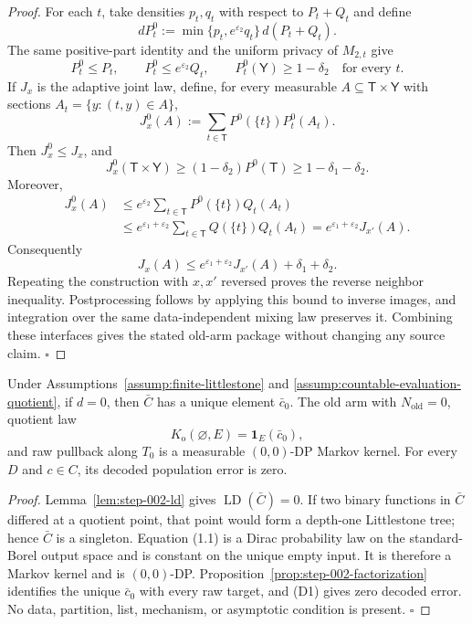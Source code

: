 \begin{proof}
For each \(t\), take densities \(p_t,q_t\) with respect to
\(P_t+Q_t\) and define
\[
 dP_t^0:=\min\{p_t,e^{\varepsilon_2}q_t\}\,d(P_t+Q_t).
\]
The same positive-part identity and the uniform privacy of \(M_{2,t}\)
give
\[
 P_t^0\le P_t,\qquad P_t^0\le e^{\varepsilon_2}Q_t,\qquad
 P_t^0(\mathsf Y)\ge1-\delta_2
 \quad\text{for every }t.
\]
If \(J_x\) is the adaptive joint law, define, for every measurable
\(A\subseteq\mathsf T\times\mathsf Y\) with sections
\(A_t=\{y:(t,y)\in A\}\),
\[
 J_x^0(A):=\sum_{t\in\mathsf T}P^0(\{t\})P_t^0(A_t).
\]
Then \(J_x^0\le J_x\), and
\[
 J_x^0(\mathsf T\times\mathsf Y)
 \ge(1-\delta_2)P^0(\mathsf T)
 \ge1-\delta_1-\delta_2.
\]
Moreover,
\[
 \begin{aligned}
 J_x^0(A)
 &\le e^{\varepsilon_2}
       \sum_{t\in\mathsf T}P^0(\{t\})Q_t(A_t)\\
 &\le e^{\varepsilon_1+\varepsilon_2}
       \sum_{t\in\mathsf T}Q(\{t\})Q_t(A_t)
  =e^{\varepsilon_1+\varepsilon_2}J_{x'}(A).
 \end{aligned}
\]
Consequently
\[
 J_x(A)\le
 e^{\varepsilon_1+\varepsilon_2}J_{x'}(A)
 +\delta_1+\delta_2.
\]
Repeating the construction with \(x,x'\) reversed proves the reverse
neighbor inequality. Postprocessing follows by applying this bound to
inverse images, and integration over the same data-independent mixing law
preserves it. Combining these interfaces gives the stated old-arm package
without changing any source claim.
\(\square\)
\end{proof}





\begin{proposition}\label{prop:step-015-zero}
Under Assumptions~\ref{assump:finite-littlestone} and
\ref{assump:countable-evaluation-quotient}, if \(d=0\), then \(\bar C\)
has a unique element \(\bar c_0\). The old arm with
\(N_{\mathrm{old}}=0\), quotient law
\[
K_{\mathrm o}(\varnothing,E)=\mathbf1_E(\bar c_0),
\tag{1.1}
\]
and raw pullback along \(T_0\) is a measurable \((0,0)\)-DP Markov kernel.
For every \(D\) and \(c\in C\), its decoded population error is zero.


\end{proposition}

\begin{proof}
Lemma~\ref{lem:step-002-ld} gives
\(\operatorname{LD}(\bar C)=0\). If two binary functions in \(\bar C\)
differed at a quotient point, that point would form a depth-one
Littlestone tree; hence \(\bar C\) is a singleton. Equation (1.1) is a
Dirac probability law on the standard-Borel output space and is constant
on the unique empty input. It is therefore a Markov kernel and is
\((0,0)\)-DP. Proposition~\ref{prop:step-002-factorization}
identifies the unique \(\bar c_0\) with every raw target, and (D1) gives
zero decoded error. No data, partition, list, mechanism, or asymptotic
condition is present. \(\square\)


\end{proof}

